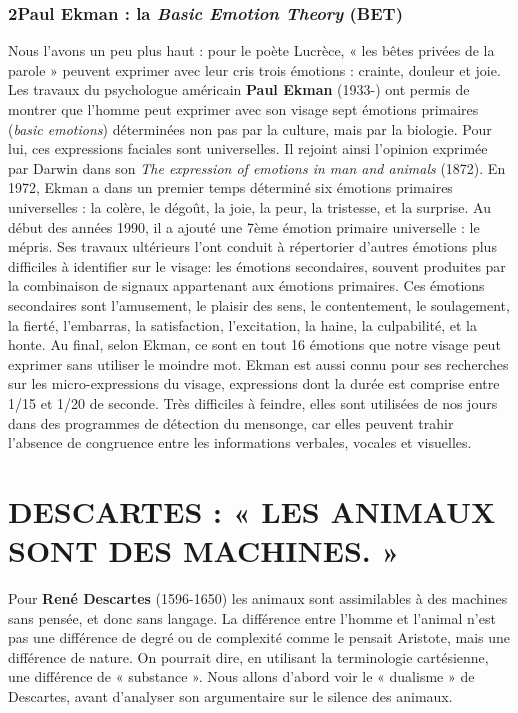 \subsubsection*{2\quad Paul Ekman : la \textit{Basic Emotion Theory} (BET)}
Nous l’avons un peu plus haut : pour le poète Lucrèce, « les bêtes privées de la parole » peuvent exprimer avec leur cris trois émotions : crainte, douleur et joie. Les travaux du psychologue américain \textbf{Paul Ekman} (1933-) ont permis de montrer que l’homme peut exprimer avec son visage sept émotions primaires (\textit{basic emotions}) déterminées non pas par la culture, mais par la biologie. Pour lui, ces expressions faciales sont universelles. Il rejoint ainsi l’opinion exprimée par Darwin dans son \textit{The expression of emotions in man and animals} (1872). En 1972, Ekman a dans un premier temps déterminé six émotions primaires universelles : la colère, le dégoût, la joie, la peur, la tristesse, et la surprise. Au début des années 1990, il a ajouté une 7ème émotion primaire universelle : le mépris. Ses travaux ultérieurs l’ont conduit à répertorier d’autres émotions plus difficiles à identifier sur le visage: les émotions secondaires, souvent produites par la combinaison de signaux appartenant aux émotions primaires. Ces émotions secondaires sont l’amusement, le plaisir des sens, le contentement, le soulagement, la fierté, l’embarras, la satisfaction, l’excitation, la haine, la culpabilité, et la honte. Au final, selon Ekman, ce sont en tout 16 émotions que notre visage peut exprimer sans utiliser le moindre mot. Ekman est aussi connu pour ses recherches sur les micro-expressions du visage, expressions dont la durée est comprise entre 1/15 et 1/20 de seconde. Très difficiles à feindre, elles sont utilisées de nos jours dans des programmes de détection du mensonge, car elles peuvent trahir l’absence de congruence entre les informations verbales, vocales et visuelles.
\clearpage
\section{DESCARTES : « LES ANIMAUX SONT DES MACHINES. »}
Pour \textbf{René Descartes} (1596-1650) les animaux sont assimilables à des machines sans pensée, et donc sans langage. La différence entre l’homme et l’animal n’est pas une différence de degré ou de complexité comme le pensait Aristote, mais une différence de nature. On pourrait dire, en utilisant la terminologie cartésienne, une différence de « substance ». Nous allons d’abord voir le « dualisme » de Descartes, avant d’analyser son argumentaire sur le silence des animaux.
